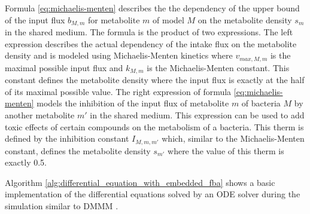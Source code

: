 
Formula \ref{eq:michaelis-menten} describes the the dependency of the upper bound of the input flux $b_{M,m}$ for metabolite $m$ of model $M$ on the metabolite density
$s_m$ in the shared medium. The formula is the product of two expressions. The left expression describes the actual dependency
of the intake flux on the metabolite density and is modeled using Michaelis-Menten kinetics where $v_{max,M,m}$ is the maximal
possible input flux and $k_{M,m}$ is the Michaelis-Menten constant. This constant defines the metabolite density where the
input flux is exactly at the half of its maximal possible value. The right expression of formula \ref{eq:michaelis-menten}
models the inhibition of the input flux of metabolite $m$ of bacteria $M$ by another metabolite $m'$ in the shared medium.
This expression can be used to add toxic effects of certain compounds on the metabolism of a bacteria. This therm is defined
by the inhibition constant $I_{M,m,m'}$ which, similar to the Michaelis-Menten constant, defines the metabolite density $s_{m'}$
where the value of this therm is exactly 0.5.

Algorithm \ref{alg:differential_equation_with_embedded_fba} shows a basic implementation of the differential equations solved by an ODE
solver during the simulation similar to DMMM \cite{zhuang_genome-scale_2011}.


